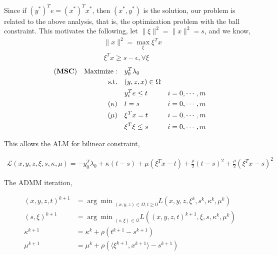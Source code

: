 \documentclass[../main]{subfiles}
\begin{document}
Since if \((y^*)^Te = (x^*)^Tx^*\), then \((x^*, y^*)\) is the solution, our problem is related to the above analysis, that is, the optimization problem with the ball constraint.
This motivates the following, let \(\|\xi\|^2 = \|x\|^2 = s\), and we know,
\begin{align}
     & \|x\|^2 = \max_\xi \xi^T x           \\
     & \xi^Tx \ge s - \epsilon, \forall \xi
\end{align}
\begin{align}
    (\textbf{MSC}) \quad \mathrm{Maximize: }\quad & y_0 ^T\lambda_0                     \\
    \mathrm{s.t.} \quad                        & (y,z,x) \in \Omega                  \\
                                               & y_i^Te \le t       & i=0, \cdots, m \\
    (\kappa) \quad                             & t= s               & i=0, \cdots, m \\
    (\mu)    \quad                             & \xi^Tx = t         & i=0, \cdots, m \\
                                               & \xi^T\xi \le s     & i=0, \cdots, m
\end{align}

This allows the ALM for bilinear constraint,

\begin{align*}
    \mathscr L\left(x,y,z,\xi,s,\kappa,\mu\right) = - y_0 ^T\lambda_0 + \kappa(t-s) + \mu(\xi^Tx - t) + \frac{\rho}{2}(t-s)^2 + \frac{\rho}{2}(\xi^Tx - s)^2
\end{align*}

The ADMM iteration,

\begin{align*}
    (x,y,z,t)^{k+1} & = {\arg\min}_{(x,y,z)\in\Omega, t\ge 0} L\left(x,y,z,\xi^k,s^k,\kappa^k,\mu^k\right)       \\
    (s, \xi)^{k+1}  & = {\arg\min}_{(s, \xi)\in\mathscr{Q}} L\left((x,y,z,t)^{k+1},\xi,s, \kappa^k, \mu^k\right) \\
    \kappa^{k+1}    & = \kappa^k + \rho\left(t^{k+1}-s^{k+1}\right)                                              \\
    \mu^{k+1}       & = \mu^k + \rho\left( \langle\xi^{k+1}, x^{k+1}\rangle - s^{k+1}\right)                     \\
\end{align*}
\end{document}

